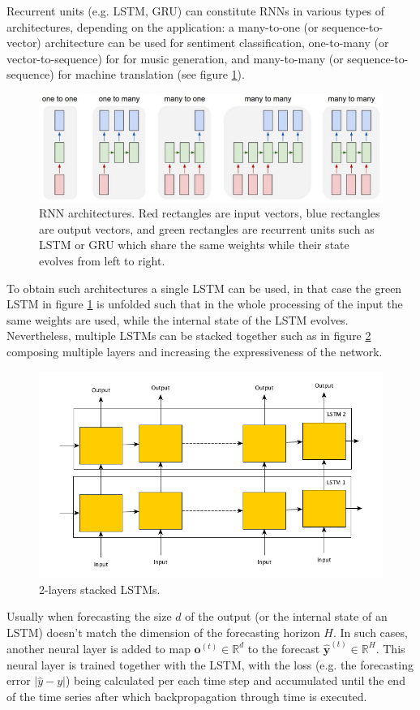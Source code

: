 \documentclass[a4paper, 12pt]{article} %
\begin{document}
	Recurrent units (e.g. LSTM, GRU) can constitute RNNs in various types of architectures, depending on the application: a many-to-one (or sequence-to-vector) architecture can be used for sentiment classification, one-to-many (or vector-to-sequence) for for music generation, and many-to-many (or sequence-to-sequence) for machine translation (see figure \ref{fig:rnn_architectures}).
	\begin{figure}
		\includegraphics[width=\linewidth]{img/rnn_architectures.png}
		\caption{RNN architectures. Red rectangles are input vectors, blue rectangles are output vectors, and green rectangles are recurrent units such as LSTM or GRU which share the same weights while their state evolves from left to right.}
		\label{fig:rnn_architectures}
	\end{figure}

	To obtain such architectures a single LSTM can be used, in that case the green LSTM in figure \ref{fig:rnn_architectures} is unfolded such that in the whole processing of the input the same weights are used, while the internal state of the LSTM evolves.	Nevertheless, multiple LSTMs can be stacked together such as in figure \ref{fig:stacked_lstm} composing multiple layers and increasing the expressiveness of the network.
	\begin{figure}
		\includegraphics[width=\linewidth]{img/stacked_lstm.png}
		\caption{2-layers stacked LSTMs. }
		\label{fig:stacked_lstm}
	\end{figure}
	Usually when forecasting the size $d$ of the output (or the internal state of an LSTM) doesn't match the dimension of the forecasting horizon $H$. In such cases, another neural layer is added to map $\pmb{o}^{(t)} \in \mathbb{R}^d$ to the forecast $\hat{\pmb{y}}^{(t)} \in \mathbb{R}^H$. This neural layer is trained together with the LSTM, with the loss (e.g. the forecasting error $|\hat{y} - y|$) being calculated per each time step and accumulated until the end of the time series after which backpropagation through time is executed.
	
\end{document}
